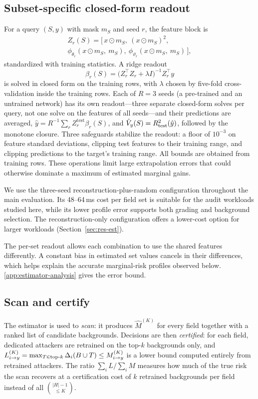 \subsection{Subset-specific closed-form readout}
For a query $(S,y)$ with mask $m_S$ and seed $r$, the feature block is
\begin{multline}
Z_{r}(S) = \big[\, x\odot m_S,\ (x \odot m_S)^{2},\\ \phi_{\theta_r}(x\odot m_S,\ m_S),\ \phi_{\vartheta_r}(x\odot m_S,\ m_S) \,\big],
\end{multline}
standardized with training statistics. A ridge readout
\begin{equation}\label{eq:ridge}
\beta_{r}(S) = \big(Z_r^{\top} Z_r + \lambda I\big)^{-1} Z_r^{\top} y
\end{equation}
is solved in closed form on the training rows, with $\lambda$ chosen by five-fold
cross-validation inside the training rows. Each of $R=3$ seeds (a pre-trained and an untrained network) has its own
readout---three separate closed-form solves per query, not one solve on the features of all seeds---and their
predictions are averaged, $\hat y = R^{-1}\sum_r Z_r^{\mathrm{test}}\beta_r(S)$, and
$\hat V_y(S)=R^2_{\mathrm{test}}(\hat y)$, followed by the monotone closure. Three safeguards stabilize the readout: a floor of $10^{-3}$ on feature standard deviations, clipping test features to their training range, and clipping predictions to the target's training range. All bounds are obtained from training rows. These operations limit large extrapolation errors that could otherwise dominate a maximum of estimated marginal gains.

We use the three-seed reconstruction-plus-random configuration throughout the main evaluation. Its 48--64\,ms cost per field set is suitable for the audit workloads studied here, while its lower profile error supports both grading and background selection. The reconstruction-only configuration offers a lower-cost option for larger workloads (Section~\ref{sec:res-est}).

The per-set readout allows each combination to use the shared features differently. A constant bias in estimated set values cancels in their differences, which helps explain the accurate marginal-risk profiles observed below. \ref{app:estimator-analysis} gives the error bound.

\subsection{Scan and certify}\label{sec:scan}
The estimator is used to \emph{scan}: it produces $\hat M^{(K)}$ for every field together with a
ranked list of candidate backgrounds. Decisions are then \emph{certified}: for each field,
dedicated attackers are retrained on the top-$k$ backgrounds only, and
$L^{(K)}_{i\to y}=\max_{T\in\text{top-}k}\Delta_i(B\cup T)\le M^{(K)}_{i\to y}$ is a lower bound computed
entirely from retrained attackers. The ratio $\sum_i L/\sum_i M$ measures how much of the true
risk the scan recovers at a certification cost of $k$ retrained backgrounds per field instead
of all $\binom{|H|-1}{\le K}$.
